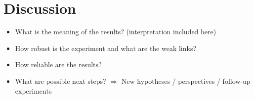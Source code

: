 \chapter{Discussion}
\begin{itemize}
	\item What is the meaning of the results? (interpretation included here)
	\item How robust is the experiment and what are the weak links?
	\item How reliable are the results?
	\item What are possible next steps? $\Rightarrow$ New hypotheses /
			perspectives / follow-up experiments
\end{itemize}
